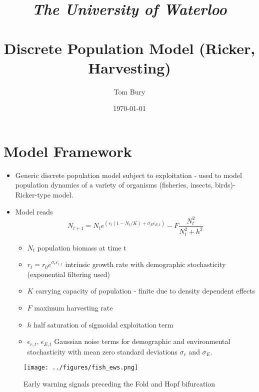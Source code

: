 \documentclass[10pt]{article} %
\title{	
\normalfont \normalsize 
\textit{The University of Waterloo} \\ [10pt] %
\horrule{0.5pt} \\[0.4cm] %
\huge Discrete Population Model (Ricker, Harvesting) %
\horrule{2pt} \\[0.5cm] %
}
\author{Tom Bury} %
\date{\normalsize\today} %
\theoremstyle{break}
\begin{document}
\maketitle %









\section{Model Framework}

\begin{itemize}

\item Generic discrete population model subject to exploitation - used to model population dynamics of a variety of organisms (fisheries, insects, birds)- Ricker-type model.

\item Model reads
\begin{equation}
N_{t+1} = N_t e^{(r_t(1-N_t/K) + \sigma_E \epsilon_{E,t} )} - F\frac{N_t^2}{N_t^2 + h^2}
\end{equation}

\begin{itemize}
\item $N_t$ population biomass at time t
\item $r_t = r_0e^{\sigma_r \epsilon_{r,t}}$ intrinsic growth rate with demographic stochasticity (exponential filtering used)
\item $K$ carrying capacity of population - finite due to density dependent effects
\item $F$ maximum harvesting rate
\item $h$ half saturation of sigmoidal exploitation term
\item $\epsilon_{r,t}$, $\epsilon_{E,t}$ Gaussian noise terms for demographic and environmental stochasticity with mean zero standard deviations $\sigma_r$ and $\sigma_E$.


\end{itemize}

\end{itemize}





\begin{figure}
\centering
\texttt{[image: ../figures/fish\_ews.png]}
\caption{Early warning signals preceding the Fold and Hopf bifurcation}
\end{figure}
\end{document}
